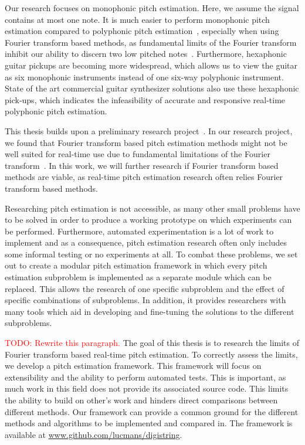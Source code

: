 \documentclass[10pt,twocolumn]{article}
\begin{document}
Our research focuses on monophonic pitch estimation. Here, we assume the signal contains at most one note. It is much easier to perform monophonic pitch estimation compared to polyphonic pitch estimation~\cite{monotopoly}, especially when using Fourier transform based methods, as fundamental limits of the Fourier transform inhibit our ability to discern two low pitched notes~\cite{nopoly}. Furthermore, hexaphonic guitar pickups are becoming more widespread, which allows us to view the guitar as six monophonic instruments instead of one six-way polyphonic instrument. State of the art commercial guitar synthesizer solutions also use these hexaphonic pick-ups, which indicates the infeasibility of accurate and responsive real-time polyphonic pitch estimation.

This thesis builds upon a preliminary research project~\cite{ik}. In our research project, we found that Fourier transform based pitch estimation methods might not be well suited for real-time use due to fundamental limitations of the Fourier transform~\cite{fourierlimit}. In this work, we will further research if Fourier transform based methods are viable, as real-time pitch estimation research often relies Fourier transform based methods.

Researching pitch estimation is not accessible, as many other small problems have to be solved in order to produce a working prototype on which experiments can be performed. Furthermore, automated experimentation is a lot of work to implement and as a consequence, pitch estimation research often only includes some informal testing or no experiments at all. To combat these problems, we set out to create a modular pitch estimation framework in which every pitch estimation subproblem is implemented as a separate module which can be replaced. This allows the research of one specific subproblem and the effect of specific combinations of subproblems. In addition, it provides researchers with many tools which aid in developing and fine-tuning the solutions to the different subproblems.

\textcolor{red}{TODO: Rewrite this paragraph.} The goal of this thesis is to research the limits of Fourier transform based real-time pitch estimation. To correctly assess the limits, we develop a pitch estimation framework. This framework will focus on extensibility and the ability to perform automated tests. This is important, as much work in this field does not provide its associated source code. This limits the ability to build on other's work and hinders direct comparisons between different methods. Our framework can provide a common ground for the different methods and algorithms to be implemented and compared in. The framework is available at \url{www.github.com/lucmans/digistring}.
\end{document}
